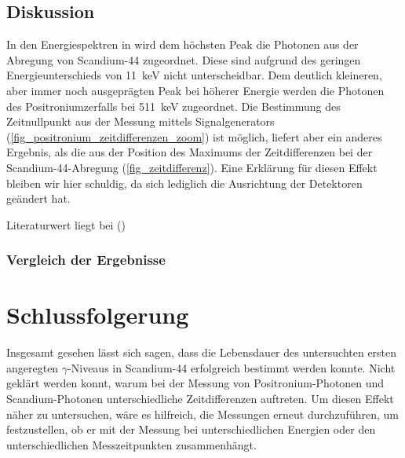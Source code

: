 \documentclass[
	a4paper,
	12pt,
	pagesize,
	ngerman
]{scrartcl}
\begin{document}
	\subsection{Diskussion}
	In den Energiespektren in  wird dem höchsten Peak die Photonen aus der Abregung von Scandium-44 zugeordnet.
	Diese sind aufgrund des geringen Energieunterschieds von \SI{11}{keV} nicht unterscheidbar.
	Dem deutlich kleineren, aber immer noch ausgeprägten Peak bei höherer Energie werden die Photonen des Positroniumzerfalls bei \SI{511}{keV} zugeordnet.
	Die Bestimmung des Zeitnullpunkt aus der Messung mittels Signalgenerators (\cref{fig_positronium_zeitdifferenzen_zoom}) ist möglich, liefert aber ein anderes Ergebnis, als die aus der Position des Maximums der Zeitdifferenzen bei der Scandium-44-Abregung (\cref{fig_zeitdifferenz}).
	Eine Erklärung für diesen Effekt bleiben wir hier schuldig, da sich lediglich die Ausrichtung der Detektoren geändert hat.

	Literaturwert liegt bei \SI{}{} (\cite{})

	\subsubsection{Vergleich der Ergebnisse}

	\section{Schlussfolgerung}
	Insgesamt gesehen lässt sich sagen, dass die Lebensdauer des untersuchten ersten angeregten $\gamma$-Niveaus in Scandium-44 erfolgreich bestimmt werden konnte.
	Nicht geklärt werden konnt, warum bei der Messung von Positronium-Photonen und Scandium-Photonen unterschiedliche Zeitdifferenzen auftreten.
	Um diesen Effekt näher zu untersuchen, wäre es hilfreich, die Messungen erneut durchzuführen, um festzustellen, ob er mit der Messung bei unterschiedlichen Energien oder den unterschiedlichen Messzeitpunkten zusammenhängt.

	\printbibliography %
\end{document}
